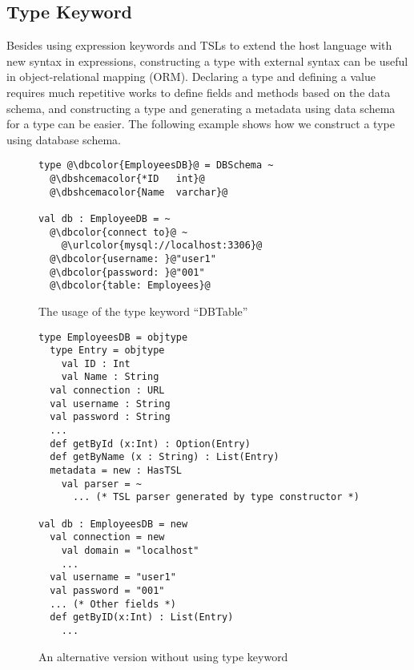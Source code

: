 \documentclass{sig-alternate}
\newcommand{\urlcolor}[1]{\textcolor[HTML]{FFCC33}{#1}}
\newcommand{\dbcolor}[1]{\textcolor[HTML]{FF47FF}{#1}}
\newcommand{\dbshcemacolor}[1]{\textcolor[HTML]{5AC3D1}{#1}}
\newcommand{\mycaption}[1]{\vspace{-4px}\caption{#1}\vspace{-2px}}
\begin{document}
\subsection{Type Keyword}
Besides using expression keywords and TSLs to extend the host language with new syntax in expressions, constructing a type with external syntax can be useful in object-relational mapping (ORM). Declaring a type and defining a value requires much repetitive works to define fields and methods based on the data schema, and constructing a type and generating a metadata using data schema for a type can be easier. The following example shows how we construct a type using database schema.

\begin{figure}
\begin{lstlisting}[style=wyvern]
type @\dbcolor{EmployeesDB}@ = DBSchema ~
  @\dbshcemacolor{*ID   int}@
  @\dbshcemacolor{Name  varchar}@

val db : EmployeeDB = ~
  @\dbcolor{connect to}@ ~
    @\urlcolor{mysql://localhost:3306}@
  @\dbcolor{username: }@"user1"
  @\dbcolor{password: }@"001"
  @\dbcolor{table: Employees}@
\end{lstlisting}
\mycaption{The usage of the type keyword ``DBTable''}
\end{figure}

\begin{figure}[ht]
\begin{lstlisting}[style=wyvern]
type EmployeesDB = objtype
  type Entry = objtype
    val ID : Int
    val Name : String 
  val connection : URL
  val username : String
  val password : String
  ...
  def getById (x:Int) : Option(Entry)
  def getByName (x : String) : List(Entry)
  metadata = new : HasTSL
    val parser = ~
      ... (* TSL parser generated by type constructor *)

val db : EmployeesDB = new
  val connection = new
    val domain = "localhost"
    ...
  val username = "user1"
  val password = "001"
  ... (* Other fields *)
  def getByID(x:Int) : List(Entry)
    ...
\end{lstlisting}
\mycaption{An alternative version without using type keyword}
\label{typekw-example-2}
\end{figure}
\end{document}
